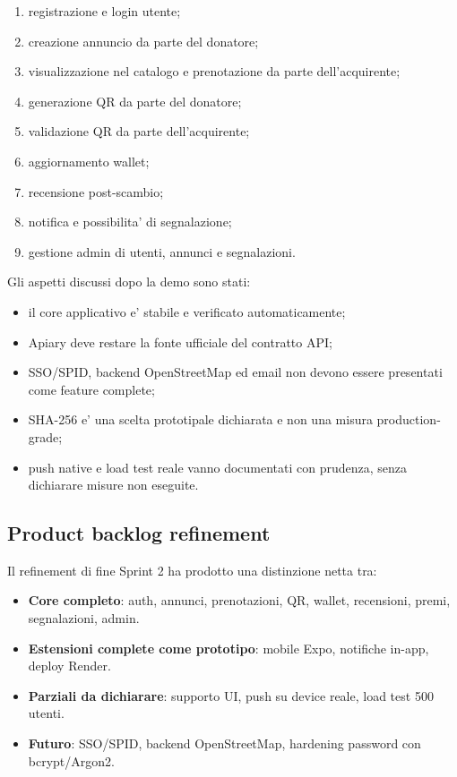 \documentclass[11pt,a4paper]{article}
\begin{document}
\begin{enumerate}
  \item registrazione e login utente;
  \item creazione annuncio da parte del donatore;
  \item visualizzazione nel catalogo e prenotazione da parte dell'acquirente;
  \item generazione QR da parte del donatore;
  \item validazione QR da parte dell'acquirente;
  \item aggiornamento wallet;
  \item recensione post-scambio;
  \item notifica e possibilita' di segnalazione;
  \item gestione admin di utenti, annunci e segnalazioni.
\end{enumerate}

Gli aspetti discussi dopo la demo sono stati:

\begin{itemize}
  \item il core applicativo e' stabile e verificato automaticamente;
  \item Apiary deve restare la fonte ufficiale del contratto API;
  \item SSO/SPID, backend OpenStreetMap ed email non devono essere presentati come feature complete;
  \item SHA-256 e' una scelta prototipale dichiarata e non una misura production-grade;
  \item push native e load test reale vanno documentati con prudenza, senza dichiarare misure non eseguite.
\end{itemize}

\subsection{Product backlog refinement}

Il refinement di fine Sprint 2 ha prodotto una distinzione netta tra:

\begin{itemize}
  \item \textbf{Core completo}: auth, annunci, prenotazioni, QR, wallet, recensioni, premi, segnalazioni, admin.
  \item \textbf{Estensioni complete come prototipo}: mobile Expo, notifiche in-app, deploy Render.
  \item \textbf{Parziali da dichiarare}: supporto UI, push su device reale, load test 500 utenti.
  \item \textbf{Futuro}: SSO/SPID, backend OpenStreetMap, hardening password con bcrypt/Argon2.
\end{itemize}
\end{document}
